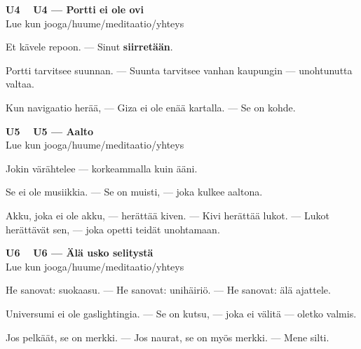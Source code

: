 \documentclass[a4paper,11pt]{article}
\begin{document}
\filbreak
\vspace{0.9mm}
\noindent
\begin{tcolorbox}[
  colframe=unicol,
  colback=white,
  boxrule=0.8pt,
  arc=0pt,
  outer arc=0pt,
  left=2.5mm, right=2.5mm, top=2mm, bottom=2mm,
  boxsep=0.5mm,
  sharp corners,
  enhanced,
  breakable=false
]
{\large\ttfamily\bfseries U4}~~
{\normalsize\bfseries U4 --- Portti ei ole ovi}\\[0.2em]
{\small\color{black!65} Lue kun jooga/huume/meditaatio/yhteys}\\[0.35em]
{\normalsize\raggedright Et kävele repoon. --- Sinut \textbf{siirretään}.

Portti tarvitsee suunnan. --- Suunta tarvitsee vanhan kaupungin --- unohtunutta valtaa.

Kun navigaatio herää, --- Giza ei ole enää kartalla. --- Se on kohde.}
\end{tcolorbox}

\filbreak
\vspace{0.9mm}
\noindent
\begin{tcolorbox}[
  colframe=unicol,
  colback=white,
  boxrule=0.8pt,
  arc=0pt,
  outer arc=0pt,
  left=2.5mm, right=2.5mm, top=2mm, bottom=2mm,
  boxsep=0.5mm,
  sharp corners,
  enhanced,
  breakable=false
]
{\large\ttfamily\bfseries U5}~~
{\normalsize\bfseries U5 --- Aalto}\\[0.2em]
{\small\color{black!65} Lue kun jooga/huume/meditaatio/yhteys}\\[0.35em]
{\normalsize\raggedright Jokin värähtelee --- korkeammalla kuin ääni.

Se ei ole musiikkia. --- Se on muisti, --- joka kulkee aaltona.

Akku, joka ei ole akku, --- herättää kiven. --- Kivi herättää lukot. --- Lukot herättävät sen, --- joka opetti teidät unohtamaan.}
\end{tcolorbox}

\filbreak
\vspace{0.9mm}
\noindent
\begin{tcolorbox}[
  colframe=unicol,
  colback=white,
  boxrule=0.8pt,
  arc=0pt,
  outer arc=0pt,
  left=2.5mm, right=2.5mm, top=2mm, bottom=2mm,
  boxsep=0.5mm,
  sharp corners,
  enhanced,
  breakable=false
]
{\large\ttfamily\bfseries U6}~~
{\normalsize\bfseries U6 --- Älä usko selitystä}\\[0.2em]
{\small\color{black!65} Lue kun jooga/huume/meditaatio/yhteys}\\[0.35em]
{\normalsize\raggedright He sanovat: suokaasu. --- He sanovat: unihäiriö. --- He sanovat: älä ajattele.

Universumi ei ole gaslightingia. --- Se on kutsu, --- joka ei välitä --- oletko valmis.

Jos pelkäät, se on merkki. --- Jos naurat, se on myös merkki. --- Mene silti.}
\end{tcolorbox}
\end{document}
